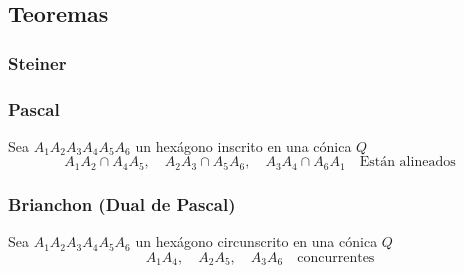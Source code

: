 \documentclass{myclass}
\begin{document}
\subsection{Teoremas}
\subsubsection{Steiner}
\subsubsection{Pascal}
Sea $A_1A_2A_3A_4A_5A_6$ un hexágono inscrito en una cónica $Q$
 \[
   A_1A_2\cap A_4A_5, \quad A_2A_3\cap A_5A_6, \quad A_3A_4\cap A_6A_1 \quad \text{Están alineados}
\] 
\subsubsection{Brianchon (Dual de Pascal)}
Sea $A_1A_2A_3A_4A_5A_6$ un hexágono circunscrito en una cónica $Q$
\[
  A_1A_4, \quad A_2A_5, \quad A_3A_6 \quad \text{concurrentes}
\] 
\end{document}
